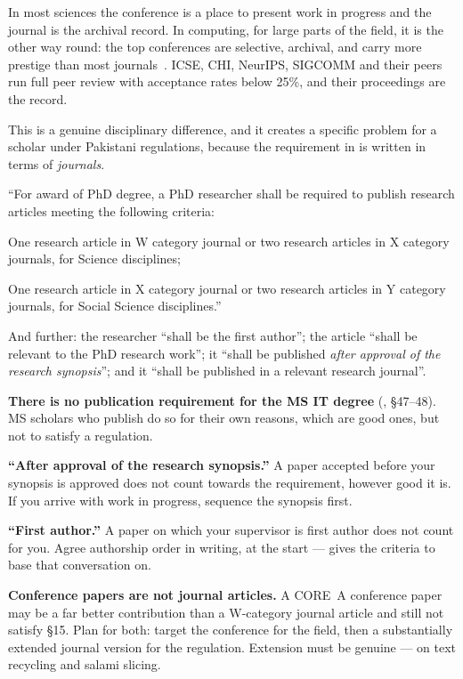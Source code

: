 In most sciences the conference is a place to present work in progress and the
journal is the archival record. In computing, for large parts of the field, it
is the other way round: the top conferences are selective, archival, and
carry more prestige than most journals~\cite{vrettas2015conferences}. ICSE,
CHI, NeurIPS, SIGCOMM and their peers run full peer review with acceptance
rates below 25\%, and their proceedings are the record.

This is a genuine disciplinary difference, and it creates a specific problem
for a scholar under Pakistani regulations, because the requirement in
 is written in terms of \emph{journals}.

\begin{regbox}
``For award of PhD degree, a PhD researcher shall be required to publish
research articles meeting the following criteria:
\begin{tight}
  \item[(a)] One research article in W category journal or two research
    articles in X category journals, for Science disciplines;
  \item[(b)] One research article in X category journal or two research
    articles in Y category journals, for Social Science disciplines.''
\end{tight}
And further: the researcher ``shall be the first author''; the article ``shall
be relevant to the PhD research work''; it ``shall be published \emph{after
approval of the research synopsis}''; and it ``shall be published in a relevant
research journal''.

\medskip
\textbf{There is no publication requirement for the MS IT degree}
(\cite{iub2024mphil}, \S47--48). MS scholars who publish do so for their own
reasons, which are good ones, but not to satisfy a regulation.
\end{regbox}

\begin{alertbox}
\textbf{``After approval of the research synopsis.''} A paper accepted before
your synopsis is approved does not count towards the requirement, however good
it is. If you arrive with work in progress, sequence the synopsis first.

\medskip
\textbf{``First author.''} A paper on which your supervisor is first author
does not count for you. Agree authorship order in writing, at the start ---
 gives the criteria to base that conversation on.

\medskip
\textbf{Conference papers are not journal articles.} A CORE~A conference paper
may be a far better contribution than a W-category journal article and still
not satisfy \S15. Plan for both: target the conference for the field, then a
substantially extended journal version for the regulation. Extension must be
genuine ---  on text recycling and salami slicing.
\end{alertbox}

